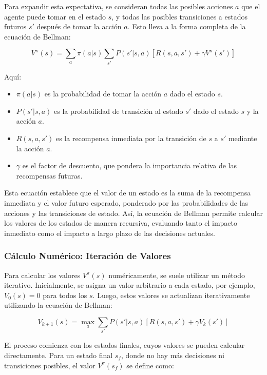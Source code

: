 \documentclass[a4paper,12pt]{report}
\begin{document}
Para expandir esta expectativa, se consideran todas las posibles acciones \(a\) que el agente 
puede tomar en el estado \(s\), y todas las posibles transiciones a estados futuros \(s'\) 
después de tomar la acción \(a\). Esto lleva a la forma completa de la ecuación de Bellman:

\begin{equation}
V^\pi(s) = \sum_{a} \pi(a|s) \sum_{s'} P(s'|s,a) \left[ R(s,a,s') + \gamma V^\pi(s') \right]
\end{equation}

Aquí:
\begin{itemize}
    \item \(\pi(a|s)\) es la probabilidad de tomar la acción \(a\) dado el estado \(s\).
    \item \(P(s'|s,a)\) es la probabilidad de transición al estado \(s'\) dado el estado \(s\) y la acción \(a\).
    \item \(R(s,a,s')\) es la recompensa inmediata por la transición de \(s\) a \(s'\) mediante la acción \(a\).
    \item \(\gamma\) es el factor de descuento, que pondera la importancia relativa de las recompensas futuras.
\end{itemize}

Esta ecuación establece que el valor de un estado es la suma de la recompensa inmediata 
y el valor futuro esperado, ponderado por las probabilidades de las acciones y las 
transiciones de estado. Así, la ecuación de Bellman permite calcular los valores de 
los estados de manera recursiva, evaluando tanto el impacto inmediato como el impacto a 
largo plazo de las decisiones actuales.

\subsubsection{Cálculo Numérico: Iteración de Valores}

Para calcular los valores \(V^\pi(s)\) numéricamente, se suele utilizar un método iterativo. 
Inicialmente, se asigna un valor arbitrario a cada estado, por ejemplo, \(V_0(s) = 0\) para 
todos los \(s\). Luego, estos valores se actualizan iterativamente utilizando la ecuación de 
Bellman:

\begin{equation}
V_{k+1}(s) = \max_{a} \sum_{s'} P(s'|s,a) \left[ R(s,a,s') + \gamma V_k(s') \right]
\end{equation}

El proceso comienza con los estados finales, cuyos valores se pueden calcular directamente. 
Para un estado final \(s_f\), donde no hay más decisiones ni transiciones posibles, el 
valor \(V^\pi(s_f)\) se define como:
\end{document}
